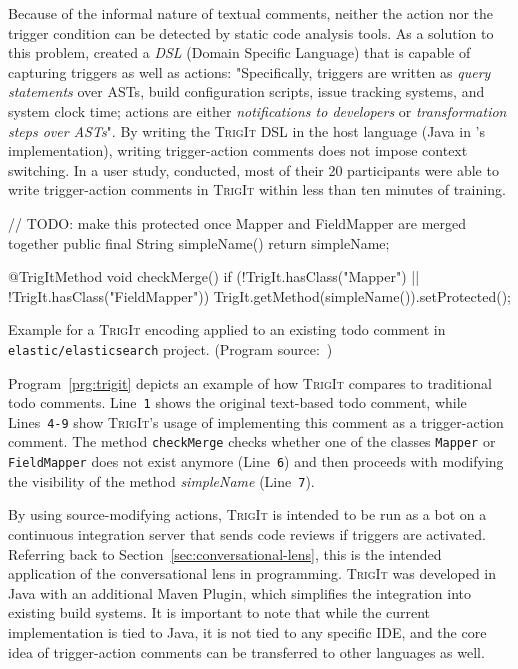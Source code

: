 Because of the informal nature of textual comments, neither the action nor the trigger condition can be detected by static code analysis tools.
As a solution to this problem, \cite{nie_framework_2019} created a \emph{DSL} (Domain Specific Language) that is capable of capturing triggers as well as actions: "Specifically, triggers are written as \emph{query statements} over ASTs, build configuration scripts, issue tracking systems, and system clock time; actions are either \emph{notifications to developers} or \emph{transformation steps over ASTs}". \cite{nie_framework_2019}
By writing the \textsc{TrigIt DSL} in the host language (Java in \citeauthor{nie_framework_2019}'s implementation), writing trigger-action comments does not impose context switching.
In a user study, \citeauthor{nie_framework_2019} conducted, most of their 20 participants were able to write trigger-action comments in \textsc{TrigIt} within less than ten minutes of training.
%
\begin{program}[h]
\begin{JavaCode}
// TODO: make this protected once Mapper and FieldMapper are merged together
public final String simpleName() { return simpleName; }

@TrigItMethod
void checkMerge() {
    if (!TrigIt.hasClass("Mapper") || !TrigIt.hasClass("FieldMapper")) {
        TrigIt.getMethod(simpleName()).setProtected();
    }
}
\end{JavaCode}
\caption{Example for a \textsc{TrigIt} encoding applied to an existing todo comment in \texttt{elastic/elasticsearch} project. (Program source:~\cite{nie_framework_2019})}
\label{prg:trigit}
\end{program}
%
Program~\ref{prg:trigit} depicts an example of how \textsc{TrigIt} compares to traditional todo comments.
Line~\verb|1| shows the original text-based todo comment, while Lines~\verb|4-9| show \textsc{TrigIt}'s usage of implementing this comment as a trigger-action comment.
The method \texttt{checkMerge} checks whether one of the classes \texttt{Mapper} or \texttt{FieldMapper} does not exist anymore (Line~\verb|6|) and then proceeds with modifying the visibility of the method \emph{simpleName} (Line~\verb|7|).

By using source-modifying actions, \textsc{TrigIt} is intended to be run as a bot on a continuous integration server that sends code reviews if triggers are activated.
Referring back to Section~\ref{sec:conversational-lens}, this is the intended application of the conversational lens in programming.
\textsc{TrigIt} was developed in Java with an additional Maven Plugin, which simplifies the integration into existing build systems.
It is important to note that while the current implementation is tied to Java, it is not tied to any specific IDE, and the core idea of trigger-action comments can be transferred to other languages as well.

